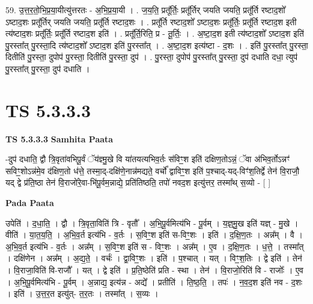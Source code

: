 \documentclass[17pt]{extarticle}
\begin{document}
59. उ॒त्त॒र॒तो॒भि॒प्र॒या॒यीत्यु॑त्तरतः - अ॒भि॒प्र॒या॒यी । . ज॒य॒ति॒ प्रतू᳚र्तिः॒ प्रतू᳚र्तिर् जयति जयति॒ प्रतू᳚र्ति रष्टाद॒शो᳚ ऽष्टाद॒शः प्रतू᳚र्तिर् जयति जयति॒ प्रतू᳚र्ति रष्टाद॒शः । . प्रतू᳚र्ति रष्टाद॒शो᳚ ऽष्टाद॒शः प्रतू᳚र्तिः॒ प्रतू᳚र्ति रष्टाद॒श इती त्य॑ष्टाद॒शः प्रतू᳚र्तिः॒ प्रतू᳚र्ति रष्टाद॒श इति॑ । . प्रतू᳚र्ति॒रिति॒ प्र - तू॒र्तिः॒ । . अ॒ष्टा॒द॒श इती त्य॑ष्टाद॒शो᳚ ऽष्टाद॒श इति॑ पु॒रस्ता᳚त् पु॒रस्ता॒दि त्य॑ष्टाद॒शो᳚ ऽष्टाद॒श इति॑ पु॒रस्ता᳚त् । . अ॒ष्टा॒द॒श इत्य॑ष्टा - द॒शः । . इति॑ पु॒रस्ता᳚त् पु॒रस्ता॒ दितीति॑ पु॒रस्ता॒ दुपोप॑ पु॒रस्ता॒ दितीति॑ पु॒रस्ता॒ दुप॑ । . पु॒रस्ता॒ दुपोप॑ पु॒रस्ता᳚त् पु॒रस्ता॒ दुप॑ दधाति दधा॒ त्युप॑ पु॒रस्ता᳚त् पु॒रस्ता॒ दुप॑ दधाति । \newline
\pagebreak
{}

\section{ TS 5.3.3.3 }

\textbf{TS 5.3.3.3 } \newline
\textbf{Samhita Paata} \newline

-दुप॑ दधाति॒ द्वौ त्रि॒वृता॑वभिपू॒र्वं ॅय॑ज्ञ्मु॒खे वि या॑तयत्यभिव॒र्तः स॑विꣳ॒॒श इति॑ दक्षिण॒तोऽन्नं॒ ॅवा अ॑भिव॒र्तोऽन्नꣳ॑ सविꣳ॒॒शोऽन्न॑मे॒व द॑क्षिण॒तो ध॑त्ते॒ तस्मा॒द्-दक्षि॑णे॒नान्न॑मद्यते॒ वर्चो᳚ द्वाविꣳ॒॒श इति॑ प॒श्चाद्-यद्-विꣳ॑श॒तिर्द्वे तेन॑ वि॒राजौ॒ यद् द्वे प्र॑ति॒ष्ठा तेन॑ वि॒राजो॑रे॒वा-भि॑पू॒र्वम॒न्नाद्ये॒ प्रति॑तिष्ठति॒ तपो॑ नवद॒श इत्यु॑त्तर॒ तस्मा᳚थ् स॒व्यो - [  ] \newline

\textbf{Pada Paata} \newline

उपेति॑ । द॒धा॒ति॒ । द्वौ । त्रि॒वृता॒विति॑ त्रि - वृतौ᳚ । अ॒भि॒पू॒र्वमित्य॑भि - पू॒र्वम् । य॒ज्ञ्॒मु॒ख इति॑ यज्ञ् - मु॒खे । वीति॑ । या॒त॒य॒ति॒ । अ॒भि॒व॒र्त इत्य॑भि - व॒र्तः । स॒विꣳ॒॒श इति॑ स-विꣳ॒॒शः । इति॑ । द॒क्षि॒ण॒तः । अन्न᳚म् । वै । अ॒भि॒व॒र्त इत्य॑भि - व॒र्तः । अन्न᳚म् । स॒विꣳ॒॒श इति॑ स - विꣳ॒॒शः । अन्न᳚म् । ए॒व । द॒क्षि॒ण॒तः । ध॒त्ते॒ । तस्मा᳚त् । दक्षि॑णेन । अन्न᳚म् । अ॒द्य॒ते॒ । वर्चः॑ । द्वा॒विꣳ॒॒शः । इति॑ । प॒श्चात् । यत् । विꣳ॒॒श॒तिः । द्वे इति॑ । तेन॑ । वि॒राजा॒विति॑ वि-राजौ᳚ । यत् । द्वे इति॑ । प्र॒ति॒ष्ठेति॑ प्रति - स्था । तेन॑ । वि॒राजो॒रिति॑ वि - राजोः᳚ । ए॒व । अ॒भि॒पू॒र्वमित्य॑भि - पू॒र्वम् । अ॒न्नाद्य॒ इत्य॑न्न - अद्ये᳚ । प्रतीति॑ । ति॒ष्ठ॒ति॒ । तपः॑ । न॒व॒द॒श इति॑ नव - द॒शः । इति॑ । उ॒त्त॒र॒त इत्यु॑त्- त॒र॒तः । तस्मा᳚त् । स॒व्यः ।  \newline
\end{document}
